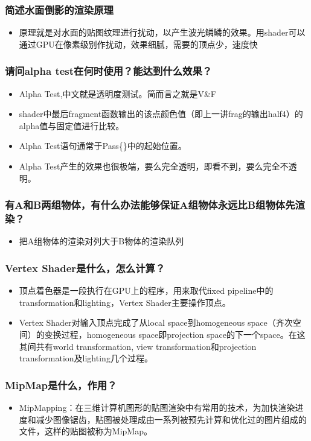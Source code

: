 \documentclass[9pt, b5paper]{article}
\begin{document}
\subsubsection{简述水面倒影的渲染原理}
\label{sec:orgde477ba}
\begin{itemize}
\item 原理就是对水面的贴图纹理进行扰动，以产生波光鳞鳞的效果。用shader可以通过GPU在像素级别作扰动，效果细腻，需要的顶点少，速度快
\end{itemize}
\subsubsection{请问alpha test在何时使用？能达到什么效果？}
\label{sec:org124d8de}
\begin{itemize}
\item Alpha Test,中文就是透明度测试。简而言之就是V\&F
\item shader中最后fragment函数输出的该点颜色值（即上一讲frag的输出half4）的alpha值与固定值进行比较。
\item Alpha Test语句通常于Pass\{\}中的起始位置。
\item Alpha Test产生的效果也很极端，要么完全透明，即看不到，要么完全不透明。
\end{itemize}
\subsubsection{有A和B两组物体，有什么办法能够保证A组物体永远比B组物体先渲染？}
\label{sec:orgeb49ef3}
\begin{itemize}
\item 把A组物体的渲染对列大于B物体的渲染队列
\end{itemize}
\subsubsection{Vertex Shader是什么，怎么计算？}
\label{sec:org5bb111b}
\begin{itemize}
\item 顶点着色器是一段执行在GPU上的程序，用来取代fixed pipeline中的transformation和lighting，Vertex Shader主要操作顶点。
\item Vertex Shader对输入顶点完成了从local space到homogeneous space（齐次空间）的变换过程，homogeneous space即projection space的下一个space。在这其间共有world transformation, view transformation和projection transformation及lighting几个过程。
\end{itemize}
\subsubsection{MipMap是什么，作用？}
\label{sec:org121ca01}
\begin{itemize}
\item MipMapping：在三维计算机图形的贴图渲染中有常用的技术，为加快渲染进度和减少图像锯齿，贴图被处理成由一系列被预先计算和优化过的图片组成的文件，这样的贴图被称为MipMap。
\end{itemize}
\end{document}
